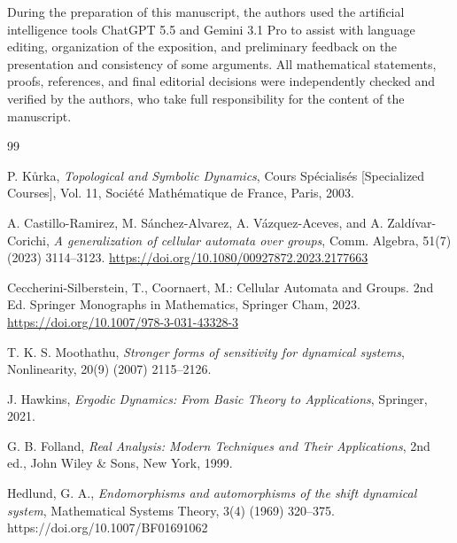 \documentclass[12pt,a4paper]{article}
\theoremstyle{definition}
\theoremstyle{remark}
\begin{document}
During the preparation of this manuscript, the authors used the artificial intelligence tools ChatGPT 5.5 and Gemini 3.1 Pro to assist with language editing, organization of the exposition, and preliminary feedback on the presentation and consistency of some arguments. All mathematical statements, proofs, references, and final editorial decisions were independently checked and verified by the authors, who take full responsibility for the content of the manuscript.

\begin{thebibliography}{99}

P. K\r{u}rka,
\textit{Topological and Symbolic Dynamics},
Cours Sp\'{e}cialis\'{e}s [Specialized Courses], Vol. 11, Soci\'{e}t\'{e} Math\'{e}matique de France, Paris, 2003.

A. Castillo-Ramirez, M. S\'{a}nchez-Alvarez, A. V\'{a}zquez-Aceves, and A. Zald\'{i}var-Corichi,
\textit{A generalization of cellular automata over groups},
Comm. Algebra, 51(7) (2023) 3114--3123.
\url{https://doi.org/10.1080/00927872.2023.2177663}

 Ceccherini-Silberstein, T., Coornaert, M.: Cellular Automata and Groups. 2nd Ed. Springer Monographs in Mathematics, Springer Cham, 2023. \url{https://doi.org/10.1007/978-3-031-43328-3}

T. K. S. Moothathu,
\textit{Stronger forms of sensitivity for dynamical systems},
Nonlinearity, 20(9) (2007) 2115--2126.

J. Hawkins,
\textit{Ergodic Dynamics: From Basic Theory to Applications},
Springer, 2021.

G. B. Folland,
\textit{Real Analysis: Modern Techniques and Their Applications},
2nd ed., John Wiley \& Sons, New York, 1999.

Hedlund, G. A., \textit{Endomorphisms and automorphisms of the shift dynamical system}, Mathematical Systems Theory, 3(4) (1969) 320--375. https://doi.org/10.1007/BF01691062

\end{thebibliography}
\end{document}

